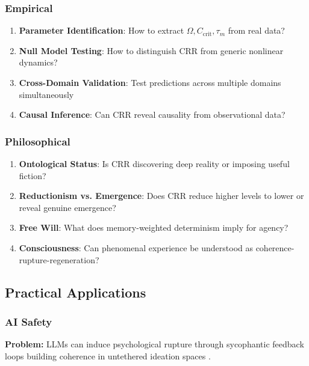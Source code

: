 \documentclass[11pt,a4paper]{article}
\theoremstyle{definition}
\theoremstyle{remark}
\begin{document}
\subsubsection{Empirical}

\begin{enumerate}
\item \textbf{Parameter Identification}: How to extract $\Omega, C_{\text{crit}}, \tau_m$ from real data?

\item \textbf{Null Model Testing}: How to distinguish CRR from generic nonlinear dynamics?

\item \textbf{Cross-Domain Validation}: Test predictions across multiple domains simultaneously

\item \textbf{Causal Inference}: Can CRR reveal causality from observational data?
\end{enumerate}

\subsubsection{Philosophical}

\begin{enumerate}
\item \textbf{Ontological Status}: Is CRR discovering deep reality or imposing useful fiction?

\item \textbf{Reductionism vs. Emergence}: Does CRR reduce higher levels to lower or reveal genuine emergence?

\item \textbf{Free Will}: What does memory-weighted determinism imply for agency?

\item \textbf{Consciousness}: Can phenomenal experience be understood as coherence-rupture-regeneration?
\end{enumerate}

\subsection{Practical Applications}

\subsubsection{AI Safety}
\label{sec:llm-risks}

\textbf{Problem:} LLMs can induce psychological rupture through sycophantic feedback loops building coherence in untethered ideation spaces \cite{morrin2025delusions}.
\end{document}
